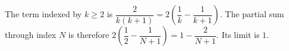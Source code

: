 The term indexed by $k\ge2$ is $\dfrac{2}{k(k+1)}=2\left(\dfrac{1}{k}-\dfrac{1}{k+1}\right)$. The partial sum through index $N$ is therefore $2\left(\dfrac{1}{2}-\dfrac{1}{N+1}\right)=1-\dfrac{2}{N+1}$. Its limit is $\boxed1$.
